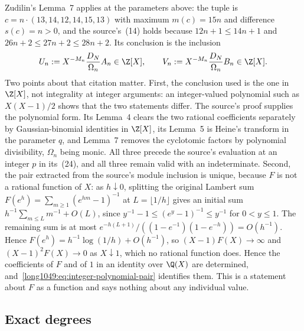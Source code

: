 \documentclass[11pt]{article}
\begin{document}
Zudilin's Lemma~7 \cite[p.~161, (23)]{zudilin2004} applies at the parameters above: the tuple is
$c=n\cdot(13,14,12,14,15,13)$ with maximum $m(c)=15n$ and difference $s(c)=n>0$,
and the source's~(14) holds because $12n+1\le14n+1$ and
$26n+2\le27n+2\le28n+2$.  Its conclusion is the inclusion
\begin{equation}\label{long1049:eq:integer-polynomial-pair}
 U_n:=X^{-M_n}\frac{D_N}{\Omega_n}A_n\in\Z[X],\qquad
 V_n:=X^{-M_n}\frac{D_N}{\Omega_n}B_n\in\Z[X].
\end{equation}
Two points about that citation matter.  First, the conclusion used is the one
in $\Z[X]$, not integrality at integer arguments: an integer-valued polynomial
such as $X(X-1)/2$ shows that the two statements differ.  The source's proof
supplies the polynomial form.  Its Lemma~4 clears the two rational coefficients
separately by Gaussian-binomial identities in $\Z[X]$, its Lemma~5 is Heine's
transform in the parameter $q$, and Lemma~7 removes the cyclotomic factors by
polynomial divisibility, $\Omega_n$ being monic.  All three precede the source's
evaluation at an integer $p$ in its~(24), and all three remain valid with an
indeterminate.  Second, the pair extracted from the source's module inclusion is
unique, because $F$ is not a rational function of $X$: as $h\downarrow0$,
splitting the original Lambert sum $F(e^h)=\sum_{m\ge1}(e^{hm}-1)^{-1}$
at $L=\lfloor1/h\rfloor$ gives an initial sum
$h^{-1}\sum_{m\le L}m^{-1}+O(L)$, since
$y^{-1}-1\le(e^y-1)^{-1}\le y^{-1}$ for $0<y\le1$.
The remaining sum is at most
$e^{-h(L+1)}/((1-e^{-1})(1-e^{-h}))=O(h^{-1})$.  Hence
$F(e^h)=h^{-1}\log(1/h)+O(h^{-1})$, so
$(X-1)F(X)\to\infty$ and $(X-1)^{2}F(X)\to0$ as $X\downarrow1$, which no
rational function does.  Hence the coefficients of $F$ and of $1$ in an identity
over $\Q(X)$ are determined, and~\eqref{long1049:eq:integer-polynomial-pair} identifies
them.  This is a statement about $F$ as a function and says nothing about any
individual value.

\subsection{Exact degrees}\label{long1049:sec:degrees}
\end{document}
